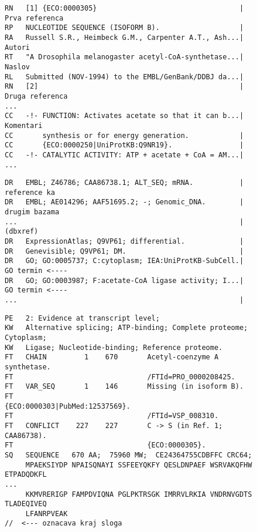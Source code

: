 \begin{figure}[h!]
\begin{lstlisting}[firstnumber=7,   basicstyle=\footnotesize\ttfamily\color{gray}]
RN   [1] {ECO:0000305}                                  | Prva referenca
RP   NUCLEOTIDE SEQUENCE (ISOFORM B).                   | 
RA   Russell S.R., Heimbeck G.M., Carpenter A.T., Ash...| Autori
RT   "A Drosophila melanogaster acetyl-CoA-synthetase...| Naslov
RL   Submitted (NOV-1994) to the EMBL/GenBank/DDBJ da...|
RN   [2]                                                | Druga referenca              
...                                                     
CC   -!- FUNCTION: Activates acetate so that it can b...| Komentari
CC       synthesis or for energy generation.            |
CC       {ECO:0000250|UniProtKB:Q9NR19}.                |
CC   -!- CATALYTIC ACTIVITY: ATP + acetate + CoA = AM...|
...                                                     
\end{lstlisting}
\begin{lstlisting}[firstnumber=30]
DR   EMBL; Z46786; CAA86738.1; ALT_SEQ; mRNA.           | reference ka
DR   EMBL; AE014296; AAF51695.2; -; Genomic_DNA.        | drugim bazama 
...                                                     | (dbxref)
DR   ExpressionAtlas; Q9VP61; differential.             |
DR   Genevisible; Q9VP61; DM.                           |
DR   GO; GO:0005737; C:cytoplasm; IEA:UniProtKB-SubCell.| GO termin <----
DR   GO; GO:0003987; F:acetate-CoA ligase activity; I...| GO termin <----
...                                                     |
\end{lstlisting}
\begin{lstlisting}[firstnumber=38]
PE   2: Evidence at transcript level;
KW   Alternative splicing; ATP-binding; Complete proteome; Cytoplasm; 
KW   Ligase; Nucleotide-binding; Reference proteome.                  
FT   CHAIN         1    670       Acetyl-coenzyme A synthetase.
FT                                /FTId=PRO_0000208425.
FT   VAR_SEQ       1    146       Missing (in isoform B).
FT                                {ECO:0000303|PubMed:12537569}.
FT                                /FTId=VSP_008310.
FT   CONFLICT    227    227       C -> S (in Ref. 1; CAA86738).
FT                                {ECO:0000305}.
SQ   SEQUENCE   670 AA;  75960 MW;  CE24364755CDBFFC CRC64;
     MPAEKSIYDP NPAISQNAYI SSFEEYQKFY QESLDNPAEF WSRVAKQFHW ETPADQDKFL
...
     KKMVRERIGP FAMPDVIQNA PGLPKTRSGK IMRRVLRKIA VNDRNVGDTS TLADEQIVEQ
     LFANRPVEAK
//  <--- oznacava kraj sloga
\end{lstlisting}
\label{txt:slog}
\end{figure}


